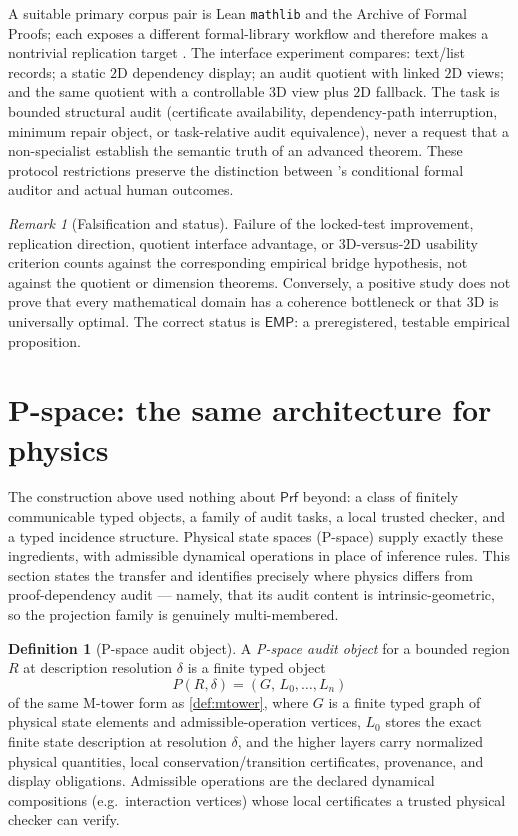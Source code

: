 \documentclass[11pt]{article}
\newcommand{\Prf}{\mathsf{Prf}}
\theoremstyle{plain}
\theoremstyle{definition}
\newtheorem{definition}[theorem]{Definition}
\theoremstyle{remark}
\newtheorem{remark}[theorem]{Remark}
\begin{document}
A suitable primary corpus pair is Lean \texttt{mathlib} and the Archive of
Formal Proofs; each exposes a different formal-library workflow and therefore
makes a nontrivial replication target \cite{mathlib2020,vanDoorn2020,
blanchette2015,huch2024}.  The interface experiment compares: text/list
records; a static $2$D dependency display; an audit quotient with linked $2$D
views; and the same quotient with a controllable $3$D view plus $2$D fallback.
The task is bounded structural audit (certificate availability, dependency-path
interruption, minimum repair object, or task-relative audit equivalence), never
a request that a non-specialist establish the semantic truth of an advanced
theorem.  These protocol restrictions preserve the distinction between
's conditional formal auditor and actual human outcomes.

\begin{remark}[Falsification and status]
\label{rem:emp-falsification}
Failure of the locked-test improvement, replication direction, quotient interface
advantage, or $3$D-versus-$2$D usability criterion counts against the corresponding
empirical bridge hypothesis, not against the quotient or dimension theorems.
Conversely, a positive study does not prove that every mathematical domain has
a coherence bottleneck or that $3$D is universally optimal.  The correct status
is $\mathsf{EMP}$: a preregistered, testable empirical proposition.
\end{remark}

\section{P-space: the same architecture for physics}
\label{sec:pspace}

The construction above used nothing about $\Prf$ beyond: a class of finitely communicable typed objects, a family of audit tasks, a local trusted checker, and a typed incidence structure.  Physical state spaces (P-space) supply exactly these ingredients, with admissible dynamical operations in place of inference rules.  This section states the transfer and identifies precisely where physics differs from proof-dependency audit --- namely, that its audit content is intrinsic-geometric, so the projection family is genuinely multi-membered.

\begin{definition}[P-space audit object]
\label{def:pspace}
A \emph{P-space audit object} for a bounded region $R$ at description resolution $\delta$ is a finite typed object
\[
  P(R,\delta)=(G,\,L_0,\ldots,L_n)
\]
of the same M-tower form as \cref{def:mtower}, where $G$ is a finite typed graph of physical state elements and admissible-operation vertices, $L_0$ stores the exact finite state description at resolution $\delta$, and the higher layers carry normalized physical quantities, local conservation/transition certificates, provenance, and display obligations.  Admissible operations are the declared dynamical compositions (e.g.\ interaction vertices) whose local certificates a trusted physical checker can verify.
\end{definition}
\end{document}
